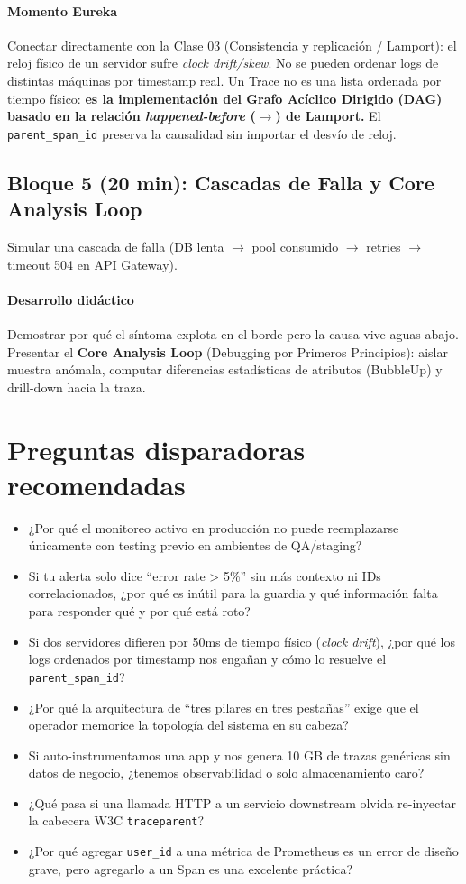 \documentclass[variant=docente,cover=institutional,mode=screen]{ua-engineering-v6-article}
\begin{document}
\paragraph{Momento Eureka}
Conectar directamente con la Clase 03 (Consistencia y replicación / Lamport): el reloj físico de un servidor sufre \emph{clock drift/skew}. No se pueden ordenar logs de distintas máquinas por timestamp real. Un Trace no es una lista ordenada por tiempo físico: \textbf{es la implementación del Grafo Acíclico Dirigido (DAG) basado en la relación \emph{happened-before} ($\rightarrow$) de Lamport.} El \texttt{parent\_span\_id} preserva la causalidad sin importar el desvío de reloj.

\subsection*{Bloque 5 (20 min): Cascadas de Falla y Core Analysis Loop}
Simular una cascada de falla (DB lenta $\rightarrow$ pool consumido $\rightarrow$ retries $\rightarrow$ timeout 504 en API Gateway).

\paragraph{Desarrollo didáctico}
Demostrar por qué el síntoma explota en el borde pero la causa vive aguas abajo. Presentar el \textbf{Core Analysis Loop} (Debugging por Primeros Principios): aislar muestra anómala, computar diferencias estadísticas de atributos (BubbleUp) y drill-down hacia la traza.

\section{Preguntas disparadoras recomendadas}

\begin{itemize}
\item ¿Por qué el monitoreo activo en producción no puede reemplazarse únicamente con testing previo en ambientes de QA/staging?
\item Si tu alerta solo dice ``error rate > 5\%'' sin más contexto ni IDs correlacionados, ¿por qué es inútil para la guardia y qué información falta para responder qué y por qué está roto?
\item Si dos servidores difieren por 50ms de tiempo físico (\emph{clock drift}), ¿por qué los logs ordenados por timestamp nos engañan y cómo lo resuelve el \texttt{parent\_span\_id}?
\item ¿Por qué la arquitectura de ``tres pilares en tres pestañas'' exige que el operador memorice la topología del sistema en su cabeza?
\item Si auto-instrumentamos una app y nos genera 10 GB de trazas genéricas sin datos de negocio, ¿tenemos observabilidad o solo almacenamiento caro?
\item ¿Qué pasa si una llamada HTTP a un servicio downstream olvida re-inyectar la cabecera W3C \texttt{traceparent}?
\item ¿Por qué agregar \texttt{user\_id} a una métrica de Prometheus es un error de diseño grave, pero agregarlo a un Span es una excelente práctica?
\end{itemize}
\end{document}
